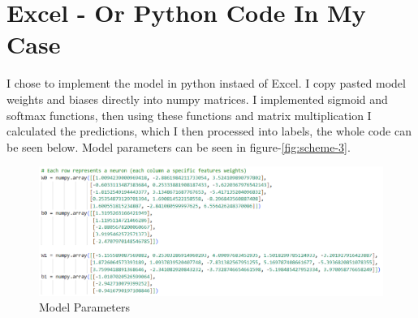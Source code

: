 \documentclass{article}
\begin{document}
\section*{Excel - Or Python Code In My Case}
I chose to implement the model in python instaed of Excel. I copy pasted model weights and biases directly into numpy matrices. I implemented sigmoid and softmax functions, then using these functions and matrix multiplication I calculated the predictions, which I then processed into labels, the whole code can be seen below. Model parameters can be seen in figure-\ref{fig:scheme-3}.
\begin{figure}[H]
    \centering
    \includegraphics[width=1\textwidth]{parameters.png}
    \caption{Model Parameters}
    \label{fig:parameters}
\end{figure}
\end{document}
